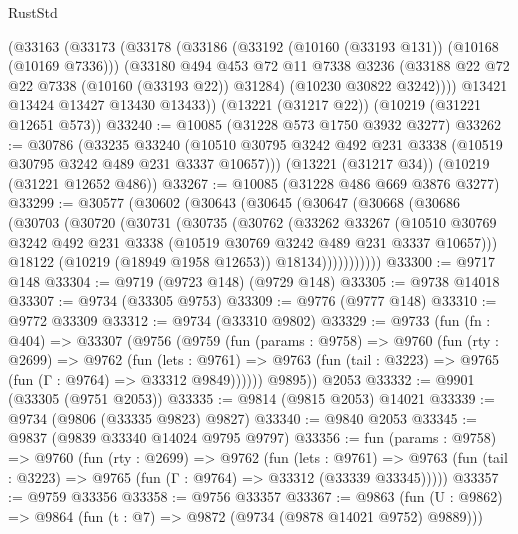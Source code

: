 \begin{lexlean}{RustStd}
\begin{coremodule}
    (@33163
      (@33173
        (@33178
          (@33186
            (@33192 (@10160 (@33193 @131)) (@10168 (@10169 @7336)))
            (@33180
              @494
              @453
              @72
              @11
              @7338
              @3236
              (@33188 @22 @72 @22 @7338 (@10160 (@33193 @22)) @31284)
              (@10230 @30822 @3242))))
        @13421
        @13424
        @13427
        @13430
        @13433))
    (@13221 (@31217 @22))
    (@10219 (@31221 @12651 @573))
@33240 := @10085 (@31228 @573 @1750 @3932 @3277)
@33262 := @30786
    (@33235
      @33240
      (@10510 @30795 @3242 @492 @231 @3338 (@10519 @30795 @3242 @489 @231 @3337 @10657)))
    (@13221 (@31217 @34))
    (@10219 (@31221 @12652 @486))
@33267 := @10085 (@31228 @486 @669 @3876 @3277)
@33299 := @30577
    (@30602
      (@30643
        (@30645
          (@30647
            (@30668
              (@30686
                (@30703
                  (@30720
                    (@30731
                      (@30735
                        (@30762
                          (@33262
                            @33267
                            (@10510
                              @30769
                              @3242
                              @492
                              @231
                              @3338
                              (@10519 @30769 @3242 @489 @231 @3337 @10657)))
                          @18122
                          (@10219 (@18949 @1958 @12653))
                          @18134)))))))))))
@33300 := @9717 @148
@33304 := @9719 (@9723 @148) (@9729 @148)
@33305 := @9738 @14018
@33307 := @9734 (@33305 @9753)
@33309 := @9776 (@9777 @148)
@33310 := @9772 @33309
@33312 := @9734 (@33310 @9802)
@33329 := @9733
    (fun (fn : @404) =>
    @33307
      (@9756
        (@9759
          (fun (params : @9758) =>
          @9760
            (fun (rty : @2699) =>
            @9762
              (fun (lets : @9761) =>
              @9763 (fun (tail : @3223) => @9765 (fun (Γ : @9764) => @33312 @9849))))))
        @9895))
    @2053
@33332 := @9901 (@33305 (@9751 @2053))
@33335 := @9814 (@9815 @2053) @14021
@33339 := @9734 (@9806 (@33335 @9823) @9827)
@33340 := @9840 @2053
@33345 := @9837 (@9839 @33340 @14024 @9795 @9797)
@33356 := fun (params : @9758) =>
  @9760
    (fun (rty : @2699) =>
    @9762
      (fun (lets : @9761) =>
      @9763 (fun (tail : @3223) => @9765 (fun (Γ : @9764) => @33312 (@33339 @33345)))))
@33357 := @9759 @33356
@33358 := @9756 @33357
@33367 := @9863
    (fun (U : @9862) => @9864 (fun (t : @7) => @9872 (@9734 (@9878 @14021 @9752) @9889)))

\end{coremodule}
\end{lexlean}

